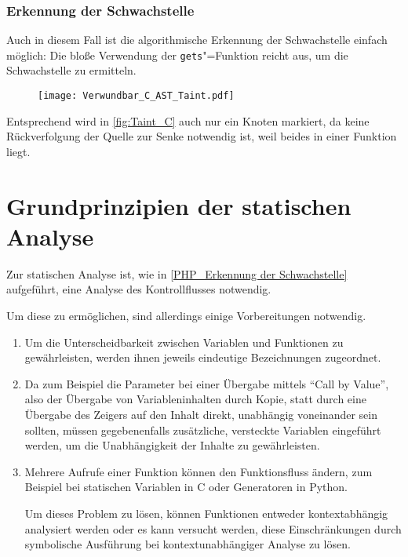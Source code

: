             \subsubsection{Erkennung der Schwachstelle}
                Auch in diesem Fall ist die algorithmische Erkennung der Schwachstelle einfach möglich:
                Die bloße Verwendung der
                \lstinline{gets}"=Funktion reicht aus,
                um die Schwachstelle zu ermitteln.

                \begin{figure}[htp]
                    \centering%
                    \texttt{[image: Verwundbar\_C\_AST\_Taint.pdf]}
                    \label{fig:Taint_C}
                \end{figure}

                Entsprechend wird in
                \vref{fig:Taint_C} auch nur ein Knoten markiert,
                da keine Rückverfolgung der Quelle zur Senke notwendig ist,
                weil beides in einer Funktion liegt.

    \section{Grundprinzipien der statischen Analyse}
        Zur statischen Analyse ist,
        wie in
        \vref{PHP_Erkennung der Schwachstelle} aufgeführt,
        eine Analyse des Kontrollflusses notwendig.

        Um diese zu ermöglichen,
        sind allerdings einige Vorbereitungen notwendig.

        \begin{enumerate}
            \item Um die Unterscheidbarkeit zwischen Variablen und
              Funktionen zu gewährleisten,
              werden ihnen jeweils eindeutige Bezeichnungen zugeordnet.
            \item Da zum Beispiel die Parameter bei einer Übergabe mittels
              \foreignquote{english}{Call by Value},
              also der Übergabe von Variableninhalten durch Kopie,
              statt durch eine Übergabe des Zeigers auf den Inhalt direkt,
              unabhängig voneinander sein sollten,
              müssen gegebenenfalls zusätzliche,
              versteckte Variablen eingeführt werden,
              um die Unabhängigkeit der Inhalte zu gewährleisten.
            \item Mehrere Aufrufe einer Funktion können den Funktionsfluss ändern,
              zum Beispiel bei statischen Variablen in C oder
              Generatoren in Python.

              Um dieses Problem zu lösen,
              können Funktionen entweder kontextabhängig analysiert werden oder
              es kann versucht werden,
              diese Einschränkungen durch symbolische Ausführung bei kontextunabhängiger Analyse zu lösen.
        \end{enumerate}

